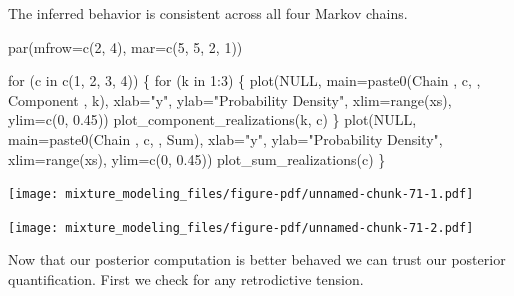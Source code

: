 \documentclass[
  letterpaper,
  DIV=11,
  numbers=noendperiod]{scrartcl}
\newenvironment{Shaded}{\begin{snugshade}}{\end{snugshade}}
\newcommand{\AttributeTok}[1]{\textcolor[rgb]{0.40,0.45,0.13}{#1}}
\newcommand{\ConstantTok}[1]{\textcolor[rgb]{0.56,0.35,0.01}{#1}}
\newcommand{\ControlFlowTok}[1]{\textcolor[rgb]{0.00,0.23,0.31}{#1}}
\newcommand{\DecValTok}[1]{\textcolor[rgb]{0.68,0.00,0.00}{#1}}
\newcommand{\FloatTok}[1]{\textcolor[rgb]{0.68,0.00,0.00}{#1}}
\newcommand{\FunctionTok}[1]{\textcolor[rgb]{0.28,0.35,0.67}{#1}}
\newcommand{\NormalTok}[1]{\textcolor[rgb]{0.00,0.23,0.31}{#1}}
\newcommand{\SpecialCharTok}[1]{\textcolor[rgb]{0.37,0.37,0.37}{#1}}
\newcommand{\StringTok}[1]{\textcolor[rgb]{0.13,0.47,0.30}{#1}}
\begin{document}
The inferred behavior is consistent across all four Markov chains.

\begin{Shaded}
\begin{Highlighting}[]
\FunctionTok{par}\NormalTok{(}\AttributeTok{mfrow=}\FunctionTok{c}\NormalTok{(}\DecValTok{2}\NormalTok{, }\DecValTok{4}\NormalTok{), }\AttributeTok{mar=}\FunctionTok{c}\NormalTok{(}\DecValTok{5}\NormalTok{, }\DecValTok{5}\NormalTok{, }\DecValTok{2}\NormalTok{, }\DecValTok{1}\NormalTok{))}

\ControlFlowTok{for}\NormalTok{ (c }\ControlFlowTok{in} \FunctionTok{c}\NormalTok{(}\DecValTok{1}\NormalTok{, }\DecValTok{2}\NormalTok{, }\DecValTok{3}\NormalTok{, }\DecValTok{4}\NormalTok{)) \{}
  \ControlFlowTok{for}\NormalTok{ (k }\ControlFlowTok{in} \DecValTok{1}\SpecialCharTok{:}\DecValTok{3}\NormalTok{) \{}
    \FunctionTok{plot}\NormalTok{(}\ConstantTok{NULL}\NormalTok{, }\AttributeTok{main=}\FunctionTok{paste0}\NormalTok{(}\StringTok{\textquotesingle{}Chain \textquotesingle{}}\NormalTok{, c, }\StringTok{\textquotesingle{}, Component \textquotesingle{}}\NormalTok{, k),}
         \AttributeTok{xlab=}\StringTok{"y"}\NormalTok{, }\AttributeTok{ylab=}\StringTok{"Probability Density"}\NormalTok{,}
         \AttributeTok{xlim=}\FunctionTok{range}\NormalTok{(xs), }\AttributeTok{ylim=}\FunctionTok{c}\NormalTok{(}\DecValTok{0}\NormalTok{, }\FloatTok{0.45}\NormalTok{))}
    \FunctionTok{plot\_component\_realizations}\NormalTok{(k, c)}
\NormalTok{  \}}
  \FunctionTok{plot}\NormalTok{(}\ConstantTok{NULL}\NormalTok{, }\AttributeTok{main=}\FunctionTok{paste0}\NormalTok{(}\StringTok{\textquotesingle{}Chain \textquotesingle{}}\NormalTok{, c, }\StringTok{\textquotesingle{}, Sum\textquotesingle{}}\NormalTok{),}
       \AttributeTok{xlab=}\StringTok{"y"}\NormalTok{, }\AttributeTok{ylab=}\StringTok{"Probability Density"}\NormalTok{,}
       \AttributeTok{xlim=}\FunctionTok{range}\NormalTok{(xs), }\AttributeTok{ylim=}\FunctionTok{c}\NormalTok{(}\DecValTok{0}\NormalTok{, }\FloatTok{0.45}\NormalTok{))}
  \FunctionTok{plot\_sum\_realizations}\NormalTok{(c)}
\NormalTok{\}}
\end{Highlighting}
\end{Shaded}

\texttt{[image: mixture\_modeling\_files/figure-pdf/unnamed-chunk-71-1.pdf]}

\texttt{[image: mixture\_modeling\_files/figure-pdf/unnamed-chunk-71-2.pdf]}

Now that our posterior computation is better behaved we can trust our
posterior quantification. First we check for any retrodictive tension.
\end{document}
